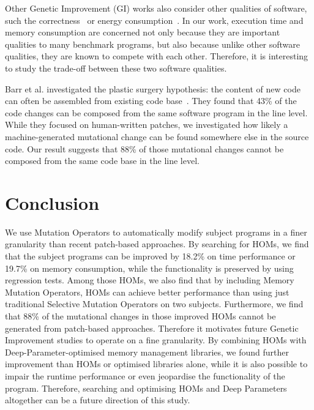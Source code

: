 \documentclass[oribibl]{llncs}
\begin{document}
Other Genetic Improvement (GI) works also consider other qualities of software, such the correctness~\cite{6035728} or energy consumption~\cite{Bruce:2015:REC:2739480.2754752}.
In our work, execution time and memory consumption are concerned not only because they are important qualities to many benchmark programs, but also because unlike other software qualities, they are known to compete with each other.
Therefore, it is interesting to study the trade-off between these two software qualities.

Barr et al. investigated the plastic surgery hypothesis: the content of new code can often be assembled from existing code base~\cite{Barr:2014:PSH:2635868.2635898}.
They found that 43\% of the code changes can be composed from the same software program in the line level.
While they focused on human-written patches, we investigated how likely a machine-generated mutational change can be found somewhere else in the source code.
Our result suggests that 88\% of those mutational changes cannot be composed from the same code base in the line level.

\section{Conclusion}
\label{sec_conclusion}

We use Mutation Operators to automatically modify subject programs in a finer granularity than recent patch-based approaches.
By searching for HOMs, we find that the subject programs can be improved by 18.2\% on time performance or 19.7\% on memory consumption, while the functionality is preserved by using regression tests.
Among those HOMs, we also find that by including Memory Mutation Operators, HOMs can achieve better performance than using just traditional Selective Mutation Operators on two subjects.
Furthermore, we find that 88\% of the mutational changes in those improved HOMs cannot be generated from patch-based approaches.
Therefore it motivates future Genetic Improvement studies to operate on a fine granularity. 
By combining HOMs with Deep-Parameter-optimised memory management libraries, we found further improvement than HOMs or optimised libraries alone, while it is also possible to impair the runtime performance or even jeopardise the functionality of the program.
Therefore, searching and optimising HOMs and Deep Parameters altogether can be a future direction of this study.


   
\end{document}
